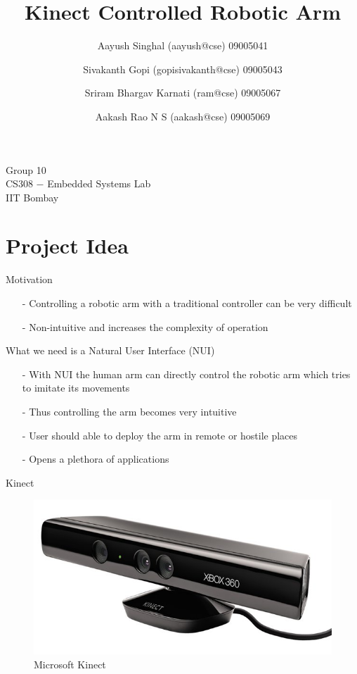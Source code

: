 \documentclass{beamer}
\title[Kinect Controlled Robotic Arm]{Kinect Controlled Robotic Arm}
\author{Aayush Singhal  (aayush@cse)    09005041 \\ \and
        Sivakanth Gopi  (gopisivakanth@cse) 09005043 \\ \and
        Sriram Bhargav Karnati  (ram@cse)   09005067 \\\and
        Aakash Rao N S  (aakash@cse)    09005069}
\date{}
\begin{document}
\begin{frame}
\titlepage
\begin{center}
Group 10\\
CS308 $-$ Embedded Systems Lab\\
IIT Bombay
\end{center}
\end{frame}

\section{Project Idea}
\begin{frame}{Motivation}
\begin{itemize}
\item[-] Controlling a robotic arm with a traditional controller can be very difficult
\item[-] Non-intuitive and increases the complexity of operation
\end{itemize}
What we need is a Natural User Interface (NUI)
\begin{itemize}
\item[-] With NUI the human arm can directly control the robotic arm which tries to imitate its movements
\item[-] Thus controlling the arm becomes very intuitive 
\item[-] User should able to deploy the arm in remote or hostile places
\item[-] Opens a plethora of applications
\end{itemize}
\end{frame}
\begin{frame}{Kinect}
  \begin{figure}
      \includegraphics[scale = .4]{kinect.jpg}
      \caption{Microsoft Kinect} 
  \end{figure}

\end{frame}
\end{document}
